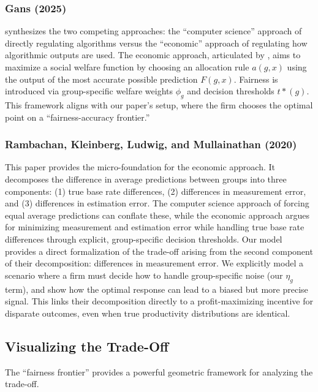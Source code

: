 \documentclass[12pt,a4paper]{article}
\theoremstyle{definition}
\theoremstyle{remark}
\begin{document}
\subsubsection{Gans (2025)}

\citet{Gans2025} synthesizes the two competing approaches: the ``computer science'' approach of directly regulating algorithms versus the ``economic'' approach of regulating how algorithmic outputs are used. The economic approach, articulated by \citet{Rambachan2020}, aims to maximize a social welfare function by choosing an allocation rule $a(g,x)$ using the output of the most accurate possible prediction $F(g,x)$. Fairness is introduced via group-specific welfare weights $\phi_g$ and decision thresholds $t*(g)$. This framework aligns with our paper's setup, where the firm chooses the optimal point on a ``fairness-accuracy frontier.'' 

\subsubsection{Rambachan, Kleinberg, Ludwig, and Mullainathan (2020)}

This paper provides the micro-foundation for the economic approach. It decomposes the difference in average predictions between groups into three components: (1) true base rate differences, (2) differences in measurement error, and (3) differences in estimation error. The computer science approach of forcing equal average predictions can conflate these, while the economic approach argues for minimizing measurement and estimation error while handling true base rate differences through explicit, group-specific decision thresholds. Our model provides a direct formalization of the trade-off arising from the second component of their decomposition: differences in measurement error. We explicitly model a scenario where a firm must decide how to handle group-specific noise (our $\eta_g$ term), and show how the optimal response can lead to a biased but more precise signal. This links their decomposition directly to a profit-maximizing incentive for disparate outcomes, even when true productivity distributions are identical.

\subsection{Visualizing the Trade-Off}

The ``fairness frontier'' provides a powerful geometric framework for analyzing the trade-off.
\end{document}

